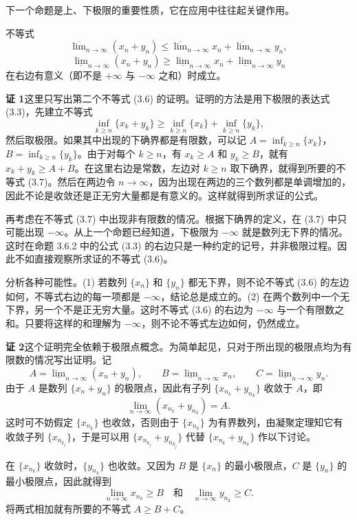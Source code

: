 下一个命题是上、下极限的重要性质，它在应用中往往起关键作用。

\begin{xproposition}[3.6.4]
不等式
\begin{equation}
  \overline{\lim}_{n\to\infty}(x_n+y_n)
  \leqslant\overline{\lim}_{n\to\infty}x_n
  +\overline{\lim}_{n\to\infty}y_n,
  \tag{3.5}
  \label{eq:3.5}
\end{equation}
\begin{equation}
  \underline{\lim}_{n\to\infty}(x_n+y_n)
  \geqslant\underline{\lim}_{n\to\infty}x_n
  +\underline{\lim}_{n\to\infty}y_n
  \tag{3.6}
  \label{eq:3.6}
\end{equation}
在右边有意义（即不是 $+\infty$ 与 $-\infty$ 之和）时成立。
\end{xproposition}
\begin{xproof}
\textbf{证 1}\quad 这里只写出第二个不等式 (3.6) 的证明。证明的方法是用下极限的表达式 (3.3)，先建立不等式
\begin{equation}
  \inf_{k\geqslant n}\{x_k+y_k\}
  \geqslant\inf_{k\geqslant n}\{x_k\}
  +\inf_{k\geqslant n}\{y_k\},
  \tag{3.7}
  \label{eq:3.7}
\end{equation}
然后取极限。如果其中出现的下确界都是有限数，可以记 $A=\inf_{k\geqslant n}\{x_k\}$，$B=\inf_{k\geqslant n}\{y_k\}$。由于对每个 $k\geqslant n$，有 $x_k\geqslant A$ 和 $y_k\geqslant B$，就有 $x_k+y_k\geqslant A+B$。在这里右边是常数，左边对 $k\geqslant n$ 取下确界，就得到所要的不等式 (3.7)。然后在两边令 $n\to\infty$，因为出现在两边的三个数列都是单调增加的，因此不论是收敛还是正无穷大量都是有意义的。这样就得到所求证的公式。

再考虑在不等式 (3.7) 中出现非有限数的情况。根据下确界的定义，在 (3.7) 中只可能出现 $-\infty$。从上一个命题已经知道，下极限为 $-\infty$ 就是数列无下界的情况。这时在命题 3.6.2 中的公式 (3.3) 的右边只是一种约定的记号，并非极限过程。因此不如直接观察所求证的不等式 (3.6)。

分析各种可能性。(1) 若数列 $\{x_n\}$ 和 $\{y_n\}$ 都无下界，则不论不等式 (3.6) 的左边如何，不等式右边的每一项都是 $-\infty$，结论总是成立的。(2) 在两个数列中一个无下界，另一个不是正无穷大量。这时不等式 (3.6) 的右边为 $-\infty$ 与一个有限数之和。只要将这样的和理解为 $-\infty$，则不论不等式左边如何，仍然成立。

\textbf{证 2}\quad 这个证明完全依赖于极限点概念。为简单起见，只对于所出现的极限点均为有限数的情况写出证明。记
\[
  A=\underline{\lim}_{n\to\infty}(x_n+y_n),\qquad
  B=\underline{\lim}_{n\to\infty}x_n,\qquad
  C=\underline{\lim}_{n\to\infty}y_n.
\]
由于 $A$ 是数列 $\{x_n+y_n\}$ 的极限点，因此有子列 $\{x_{n_k}+y_{n_k}\}$ 收敛于 $A$，即
\[
  \lim_{n\to\infty}(x_{n_k}+y_{n_k})=A.
\]
这时可不妨假定 $\{x_{n_k}\}$ 也收敛，否则由于 $\{x_{n_k}\}$ 为有界数列，由凝聚定理知它有收敛子列 $\{x_{n_{k_j}}\}$，于是可以用 $\{x_{n_{k_j}}+y_{n_{k_j}}\}$ 代替 $\{x_{n_k}+y_{n_k}\}$ 作以下讨论。

在 $\{x_{n_k}\}$ 收敛时，$\{y_{n_k}\}$ 也收敛。又因为 $B$ 是 $\{x_n\}$ 的最小极限点，$C$ 是 $\{y_n\}$ 的最小极限点，因此就得到
\[
  \lim_{n\to\infty}x_{n_k}\geqslant B
  \quad\text{和}\quad
  \lim_{n\to\infty}y_{n_k}\geqslant C.
\]
将两式相加就有所要的不等式 $A\geqslant B+C$。
\end{xproof}

